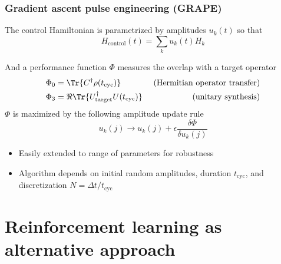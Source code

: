 \documentclass{beamer}
\begin{document}
\begin{frame}[allowframebreaks]
\frametitle{Gradient ascent pulse engineering (GRAPE)}

The control Hamiltonian is parametrized by amplitudes $u_k(t)$ so that
\begin{equation}
    H_\text{control}(t) = \sum_k u_k(t) H_k
\end{equation}

And a performance function $\Phi$ measures the overlap with a target operator
\begin{align*}
    \Phi_0 &= \Tr{C^\dagger \rho(t_\text{cyc})} &
        \text{ (Hermitian operator transfer)} \\
    \Phi_3 &= \Re \Tr{U_\text{target}^\dagger U(t_\text{cyc})} &
        \text{ (unitary synthesis)}
\end{align*}
$\Phi$ is maximized by the following amplitude update rule
\begin{equation}
    u_k(j) \to u_k(j) + \epsilon \frac{\delta \Phi}{\delta u_k(j)}
\end{equation}

\begin{itemize}
    \item Easily extended to range of parameters for robustness
    \item Algorithm depends on initial random amplitudes, duration $t_\text{cyc}$, and discretization $N = \Delta t/t_\text{cyc}$
\end{itemize}

\end{frame}

\section{Reinforcement learning as alternative approach}
\end{document}
